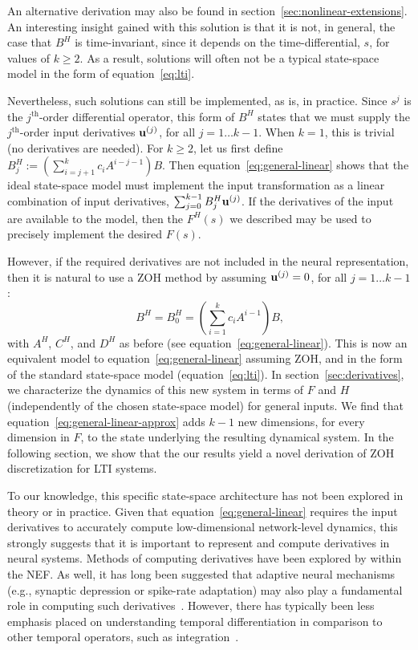 An alternative derivation may also be found in section~\ref{sec:nonlinear-extensions}. %
An interesting insight gained with this solution is that it is not, in general, the case that $B^H$ is time-invariant, since it depends on the time-differential, $s$, for values of $k \ge 2$.
As a result, solutions will often not be a typical state-space model in the form of equation~\ref{eq:lti}.

Nevertheless, such solutions can still be implemented, as is, in practice.
Since $s^j$ is the $j^{\text{th}}$-order differential operator, this form of $B^H$ states that we must supply the $j^{\text{th}}$-order input derivatives $\mathbf{u}^{(j)}$, for all $j = 1 \ldots k - 1$.
When $k = 1$, this is trivial (no derivatives are needed).
For $k \ge 2$, let us first define $B^H_j:= \left( \sum_{i=j+1}^k c_i A^{i-j-1} \right) B$.
Then equation~\ref{eq:general-linear} shows that the ideal state-space model must implement the input transformation as a linear combination of input derivatives, $\sum_{j=0}^{k-1} B^H_j \mathbf{u}^{(j)}$.
If the derivatives of the input are available to the model, then the $F^{H}(s)$ we described may be used to precisely implement the desired $F(s)$.

However, if the required derivatives are not included in the neural representation, then it is natural to use a ZOH method by assuming $\mathbf{u}^{(j)} = 0$, for all $j = 1 \ldots k - 1$:
\begin{equation} \label{eq:general-linear-approx}
B^H = B^H_0 =  \left( \sum_{i=1}^k c_i A^{i-1} \right) B \text{,}
\end{equation}
with $A^H$, $C^H$, and $D^H$ as before (see equation~\ref{eq:general-linear}).
This is now an equivalent model to equation~\ref{eq:general-linear} assuming ZOH, and in the form of the standard state-space model (equation~\ref{eq:lti}).
In section~\ref{sec:derivatives}, we characterize the dynamics of this new system in terms of $F$ and $H$ (independently of the chosen state-space model) for general inputs.
We find that equation~\ref{eq:general-linear-approx} adds $k - 1$ new dimensions, for every dimension in $F$, to the state underlying the resulting dynamical system.
In the following section, we show that the our results yield a novel derivation of ZOH discretization for LTI systems.

To our knowledge, this specific state-space architecture has not been explored in theory or in practice.
Given that equation~\ref{eq:general-linear} requires the input derivatives to accurately compute low-dimensional network-level dynamics, this strongly suggests that it is important to represent and compute derivatives in neural systems.
Methods of computing derivatives have been explored by \citet{tripp2010} within the NEF.
As well, it has long been suggested that adaptive neural mechanisms (e.g., synaptic depression or spike-rate adaptation) may also play a fundamental role in computing such derivatives~\citep{abbott2004synaptic, lundstrom2008fractional}.
However, there has typically been less emphasis placed on understanding temporal differentiation in comparison to other temporal operators, such as integration~\citep{tripp2010}.

